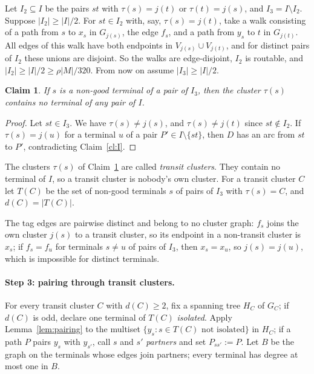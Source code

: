 \documentclass[11pt,letterpaper]{article}
\newtheorem{claim}{Claim}
\theoremstyle{definition}
\begin{document}
Let $I_2\subseteq I$ be the pairs $st$ with $\tau(s)=j(t)$ or $\tau(t)=j(s)$, and
$I_3=I\setminus I_2$. Suppose $|I_2|\ge|I|/2$. For $st\in I_2$ with, say, $\tau(s)=j(t)$, take
a walk consisting of a path from $s$ to $x_s$ in $G_{j(s)}$, the edge $f_s$, and a path from
$y_s$ to $t$ in $G_{j(t)}$. All edges of this walk have both endpoints in
$V_{j(s)}\cup V_{j(t)}$, and for distinct pairs of $I_2$ these unions are disjoint. So the
walks are edge-disjoint, $I_2$ is routable, and $|I_2|\ge|I|/2\ge\rho|M|/320$. From now on
assume $|I_3|\ge|I|/2$.

\begin{claim}\label{cl:transit}
If $s$ is a non-good terminal of a pair of $I_3$, then the cluster $\tau(s)$ contains no
terminal of any pair of $I$.
\end{claim}
\begin{proof}
Let $st\in I_3$. We have $\tau(s)\ne j(s)$, and $\tau(s)\ne j(t)$ since $st\notin I_2$. If
$\tau(s)=j(u)$ for a terminal $u$ of a pair $P'\in I\setminus\{st\}$, then $D$ has an arc from
$st$ to $P'$, contradicting Claim~\ref{cl:I}.
\end{proof}

The clusters $\tau(s)$ of Claim~\ref{cl:transit} are called \emph{transit clusters}. They
contain no terminal of $I$, so a transit cluster is nobody's own cluster. For a transit
cluster $C$ let $T(C)$ be the set of non-good terminals $s$ of pairs of $I_3$ with $\tau(s)=C$,
and $d(C)=|T(C)|$.

The tag edges are pairwise distinct and belong to no cluster graph: $f_s$ joins the own
cluster $j(s)$ to a transit cluster, so its endpoint in a non-transit cluster is $x_s$; if
$f_s=f_u$ for terminals $s\ne u$ of pairs of $I_3$, then $x_s=x_u$, so $j(s)=j(u)$, which is
impossible for distinct terminals.

\paragraph{Step 3: pairing through transit clusters.}
For every transit cluster $C$ with $d(C)\ge2$, fix a spanning tree $H_C$ of $G_C$; if $d(C)$ is
odd, declare one terminal of $T(C)$ \emph{isolated}. Apply Lemma~\ref{lem:pairing} to the
multiset $\{y_s:s\in T(C)\text{ not isolated}\}$ in $H_C$; if a path $P$ pairs $y_s$ with
$y_{s'}$, call $s$ and $s'$ \emph{partners} and set $P_{ss'}:=P$. Let $B$ be the graph on the
terminals whose edges join partners; every terminal has degree at most one in $B$.
\end{document}
